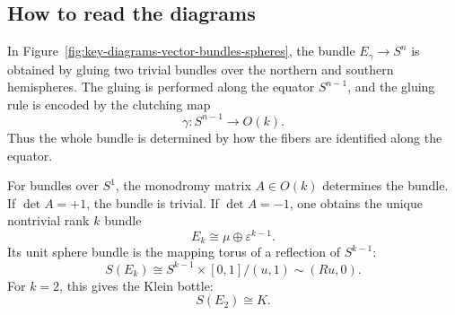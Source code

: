\documentclass[12pt,a4paper]{article}
\theoremstyle{notespace}
\begin{document}
\FloatBarrier

\subsection*{How to read the diagrams}

In Figure~\ref{fig:key-diagrams-vector-bundles-spheres}, the bundle \(E_\gamma\to S^n\) is obtained by gluing two trivial bundles over the northern and southern hemispheres. The gluing is performed along the equator \(S^{n-1}\), and the gluing rule is encoded by the clutching map
\[
\gamma:S^{n-1}\longrightarrow O(k).
\]
Thus the whole bundle is determined by how the fibers are identified along the equator.

For bundles over \(S^1\), the monodromy matrix \(A\in O(k)\) determines the bundle. If \(\det A=+1\), the bundle is trivial. If \(\det A=-1\), one obtains the unique nontrivial rank \(k\) bundle
\[
E_k\cong \mu\oplus \varepsilon^{k-1}.
\]
Its unit sphere bundle is the mapping torus of a reflection of \(S^{k-1}\):
\[
S(E_k)
\cong
S^{k-1}\times[0,1]/(u,1)\sim(Ru,0).
\]
For \(k=2\), this gives the Klein bottle:
\[
S(E_2)\cong K.
\]
	
\end{document}
